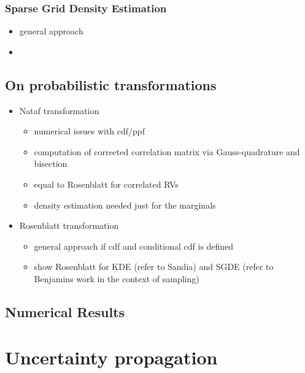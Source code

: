 \subsection{Sparse Grid Density Estimation}
\label{sec:sparse-grid-density}

\begin{itemize}
\item general approach
\item {}
\end{itemize}

\section{On probabilistic transformations}
\label{sec:on-prob-transformations}

\begin{itemize}
\item Nataf transformation
  \begin{itemize}
  \item numerical issues with cdf/ppf
  \item computation of corrected correlation matrix via
    Gauss-quadrature and bisection
  \item equal to Rosenblatt for correlated RVs
  \item density estimation needed just for the marginals
  \end{itemize}
\item Rosenblatt transformation
  \begin{itemize}
  \item general approach if cdf and conditional cdf is defined
  \item show Rosenblatt for KDE (refer to Sandia) and SGDE (refer to
    Benjamins work in the context of sampling)
  \end{itemize}
\end{itemize}

\section{Numerical Results}
\label{sec:im-numerical-results}


\chapter{Uncertainty propagation}
\label{cha:uncert-prop}

